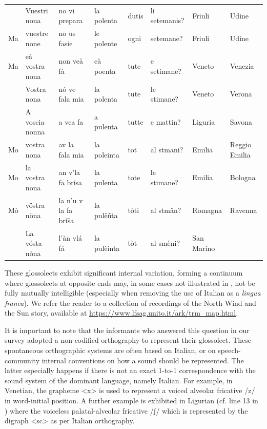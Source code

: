 \documentclass[a4paper,11pt]{article}
\begin{document}
\begin{table}
\begin{tabular}{llllllll}
& Vuestri nona & no vi prepara & la polenta & dutis & li setemanis?      & Friuli        & Udine              \\
Ma & vuestre none & no us fasie & le polente & ogni & setemane?          & Friuli        & Udine              \\
Ma & eà vostra nona & non veà fà & eà poenta & tute & e setimane?        & Veneto                       & Venezia            \\
& Vostra nona & nó ve fala mia & la polenta & tute & le stimane?         & Veneto                       & Verona             \\
& A voscia nonna & a vea fa & a pulenta & tutte & e mattin?              & Liguria                      & Savona             \\
Mo & vostra nona & av la fala mia & la poleinta & tot & al stmani?       & Emilia                       & Reggio  Emilia \\
Mo & la vostra nona & an v'la fa brisa & la pulenta & tote & le stimane? & Emilia                       & Bologna            \\
Mò & vöstra nöna & la n'u v la fa bríša  &la pulěñta & tòti & al stmân? & Romagna                      & Ravenna            \\
& La vósta nòna & l'àn vlá fá & la pulèinta & tòt & al smèni?            & San Marino                   &                    \\\bottomrule
\end{tabular}
\end{table}

These glossolects exhibit significant internal variation, forming a continuum where glossolects at opposite ends may, in some cases not illustrated in , not be fully mutually intelligible (especially when removing the use of Italian as a \textit{lingua franca}). We refer the reader to a collection of recordings of the North Wind and the Sun story, available at \url{https://www.lfsag.unito.it/ark/trm_map.html}.

It is important to note that the informants who answered this question in our survey adopted a non-codified orthography to represent their glossolect. These spontaneous orthographic systems are often based on Italian, or on speech-community internal conventions on how a sound should be represented. The latter especially happens if there is not an exact 1-to-1 correspondence with the sound system of the dominant language, namely Italian. For example, in Venetian, the grapheme <x> is used to represent a voiced alveolar fricative /z/ in word-initial position. A further example is exhibited in Ligurian (cf. line 13 in ) where the voiceless palatal-alveolar fricative /ʃ/ which is represented by the digraph <sc> as per Italian orthography.
\end{document}
